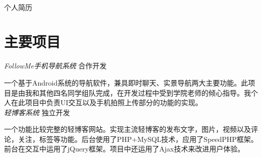 \documentclass[10pt]{article} %
\begin{document}
\color{text1} %


\par{\\ %
{\color{headings} 个人简历 \\[15pt]\par} %
	

\begin{minipage}[t]{0.5\textwidth} %
\vspace{0pt} %
	

\section{主要项目} 


{\large \textit{FollowMe手机导航系统}} \hfill  \hfill {\textsc{合作开发}\\}

\normalsize{一个基于Android系统的导航软件，兼具即时聊天、实景导航两大主要功能。此项目是由我和其他四名同学组队完成，在开发过程中受到学院老师的倾心指导。我个人在此项目中负责UI交互以及手机拍照上传部分的功能的实现。}\\


{\large \textit{轻博客系统}} \hfill  \hfill {\textsc{独立开发}\\}

\normalsize{一个功能比较完整的轻博客网站。实现主流轻博客的发布文字，图片，视频以及评论，关注，标签等功能。后台使用了PHP+MySQL技术，应用了SpeedPHP框架。前台在交互中运用了jQuery框架。项目中还运用了Ajax技术来改进用户体验。}\\


\end{minipage}}
\end{document}
